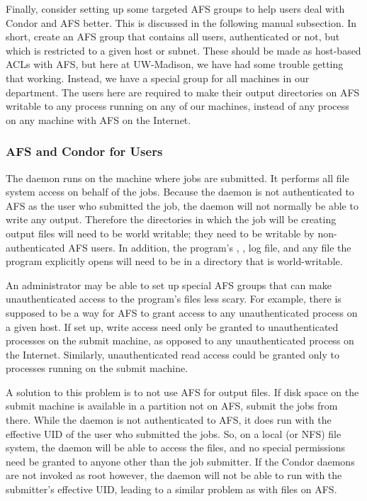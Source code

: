 Finally, consider setting up some targeted AFS groups to help 
users deal with Condor and AFS better.
This is discussed in the following manual subsection.
In short, create an AFS group that
contains all users, authenticated or not,
but which is restricted to a given host or subnet.
These should be made as host-based ACLs with AFS,
but here at UW-Madison, we have had some trouble getting that working.
Instead, we have a special group for all machines in our department.
The users here are required to make their output
directories on AFS writable to any process running on any of our
machines, instead of any process on any machine with AFS on the
Internet.

\subsubsection{\label{sec:Condor-AFS-Users}AFS and Condor for Users}

The  daemon runs on the machine where jobs are submitted.
It performs all file system access on behalf of the jobs.
Because the  daemon is not authenticated to AFS
as the user who submitted the job, the  daemon
will not normally be able to write any output.
Therefore the directories in which the job will be creating output files
will need to be world writable; they need to be writable by
non-authenticated AFS users.
In addition, the program's , , log file,
and any file the program explicitly opens
will need to be in a directory that is world-writable.

An administrator may be able to set up special AFS groups that can make 
unauthenticated access to the program's files less scary.
For example, there is
supposed to be a way for AFS to grant access to any unauthenticated
process on a given host. 
If set up,
write access need only be granted to unauthenticated processes 
on the submit machine,
as opposed to any unauthenticated process on the Internet.
Similarly,
unauthenticated read access could be granted only to processes running
on the submit machine.

A solution to this problem is to not use AFS for output files.
If disk space on the submit machine is available in a partition not on AFS,
submit the jobs from there.
While the  daemon is not authenticated to AFS,
it does run with the effective UID of the user who submitted the jobs.
So, on a local (or NFS) file system,
the  daemon will be able to access the files,
and no special permissions need be granted to anyone other than the job
submitter.
If the Condor daemons are not invoked as root however,
the  daemon will not be able to run with the submitter's
effective UID, leading to
a similar problem as with files on AFS.

